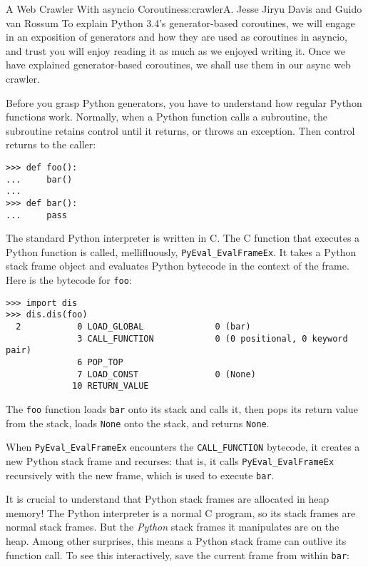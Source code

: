 \begin{aosachapter}{A Web Crawler With asyncio Coroutines}{s:crawler}{A. Jesse Jiryu Davis and Guido van Rossum}
To explain Python 3.4's generator-based coroutines, we will engage in an
exposition of generators and how they are used as coroutines in asyncio,
and trust you will enjoy reading it as much as we enjoyed writing it.
Once we have explained generator-based coroutines, we shall use them in
our async web crawler.

\label{how-python-generators-work}

Before you grasp Python generators, you have to understand how regular
Python functions work. Normally, when a Python function calls a
subroutine, the subroutine retains control until it returns, or throws
an exception. Then control returns to the caller:

\begin{verbatim}
>>> def foo():
...     bar()
...
>>> def bar():
...     pass
\end{verbatim}

The standard Python interpreter is written in C. The C function that
executes a Python function is called, mellifluously,
\texttt{PyEval\_EvalFrameEx}. It takes a Python stack frame object and
evaluates Python bytecode in the context of the frame. Here is the
bytecode for \texttt{foo}:

\begin{verbatim}
>>> import dis
>>> dis.dis(foo)
  2           0 LOAD_GLOBAL              0 (bar)
              3 CALL_FUNCTION            0 (0 positional, 0 keyword pair)
              6 POP_TOP
              7 LOAD_CONST               0 (None)
             10 RETURN_VALUE
\end{verbatim}

The \texttt{foo} function loads \texttt{bar} onto its stack and calls
it, then pops its return value from the stack, loads \texttt{None} onto
the stack, and returns \texttt{None}.

When \texttt{PyEval\_EvalFrameEx} encounters the \texttt{CALL\_FUNCTION}
bytecode, it creates a new Python stack frame and recurses: that is, it
calls \texttt{PyEval\_EvalFrameEx} recursively with the new frame, which
is used to execute \texttt{bar}.


It is crucial to understand that Python stack frames are allocated in
heap memory! The Python interpreter is a normal C program, so its stack
frames are normal stack frames. But the \emph{Python} stack frames it
manipulates are on the heap. Among other surprises, this means a Python
stack frame can outlive its function call. To see this interactively,
save the current frame from within \texttt{bar}:


\end{aosachapter}
